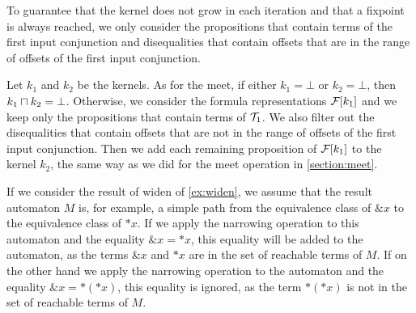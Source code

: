 To guarantee that the kernel does not grow in each iteration
and that a fixpoint is always reached, we only consider the propositions that contain terms of the first input conjunction
and disequalities that contain offsets that are in the range of offsets of the first input conjunction.


Let $k_1$ and $k_2$ be the kernels.
As for the meet, if either $k_1 = \bot$ or $k_2 = \bot$, then $k_1 \sqcap k_2 = \bot$.
Otherwise, we consider the formula representations $\mathcal{F}[k_1]$ and we keep only the propositions that contain terms of $\mathcal{T}_1$.
We also filter out the disequalities that contain offsets that are not in the range of offsets of the first input conjunction.
Then we add each remaining proposition of $\mathcal{F}[k_1]$ to the kernel $k_2$,
the same way as we did for the meet operation in \cref{section:meet}.

\begin{example}
    If we consider the result of widen of \cref{ex:widen}, we assume that the result automaton $M$
    is, for example, a simple path from the equivalence class of $\&x$ to the equivalence class of $*x$.
    If we apply the narrowing operation to this automaton and the equality $\&x = *x$, this equality will
    be added to the automaton, as the terms $\&x$ and $*x$ are in the set of reachable terms of $M$.
    If on the other hand we apply the narrowing operation to the automaton and the equality $\&x = *(*x)$,
    this equality is ignored, as the term $*(*x)$ is not in the set of reachable terms of $M$.
\end{example}
